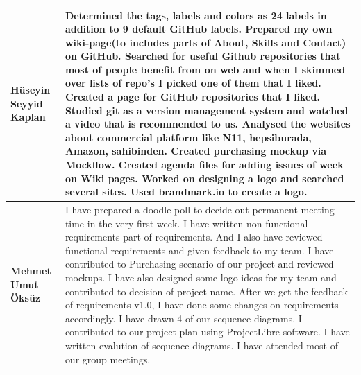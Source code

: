 \documentclass[]{article}
\begin{document}
\begin{table}[H]
{\begin{tabulary}{1.3\textwidth}{LL}
            \textbf{Hüseyin Seyyid Kaplan} & Determined the tags, labels and colors as 24 labels in addition to 9 default GitHub labels. Prepared my own wiki-page(to includes parts of About, Skills and Contact) on GitHub. Searched for useful Github repositories that most of people benefit from on web and when I skimmed over lists of repo’s I picked one of them that I liked. Created a page for GitHub repositories that I liked. Studied git as a version management system and watched a video that is recommended to us. Analysed the websites about commercial platform like N11, hepsiburada, Amazon, sahibinden. Created purchasing mockup via Mockflow. Created agenda files for adding issues of week on Wiki pages. Worked on designing a logo and searched several sites. Used brandmark.io to create a logo.                                                                                                                                                                                                                                                                                                                                                                                                                                                                                                                                                                                                                                                                                                                                                                                                                                 \\ \midrule
            \textbf{Mehmet Umut Öksüz}     & I have prepared a doodle poll to decide out permanent meeting time in the very first week. I have written non-functional requirements part of requirements. And I also have reviewed functional requirements and given feedback to my team. I have contributed to Purchasing scenario of our project and reviewed mockups. I have also designed some logo ideas for my team and contributed to decision of project name. After we get the feedback of requirements v1.0, I have done some changes on requirements accordingly. I have drawn 4 of our sequence diagrams. I contributed to our project plan using ProjectLibre software. I have written evalution of sequence diagrams. I have attended most of our group meetings.                                                                                                                                                                                                                                                                                                                                                                                                                                                                                                                                                                                                                                                                                                                                                                                                                                                                                      \\ \midrule

\end{tabulary}}
\end{table}
\end{document}
